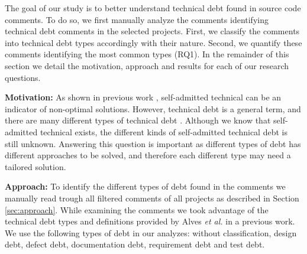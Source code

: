The goal of our study is to better understand technical debt found in source code comments. To do so, we first manually analyze the comments identifying technical debt comments in the selected projects. First, we classify the comments into technical debt types accordingly with their nature. Second, we quantify these comments identifying the most common types (RQ1). In the remainder of this section we detail the motivation, approach and results for each of our research questions.  

\vspace{3mm}
\noindent\rqi
\vspace{3mm}


\noindent\textbf{Motivation:} As shown in previous work \cite{Potdar2014ICSME}, self-admitted technical can be an indicator of non-optimal solutions. However, technical debt is a general term, and there are many different types of technical debt \cite{Alves2014MTD}. Although we know that self-admitted technical exists, the different kinds of self-admitted technical debt is still  unknown. Answering this question is important as different types of debt has different approaches to be solved, and therefore each different type may need a tailored solution.


\vspace{1mm}
\noindent\textbf{Approach:} To identify the different types of debt found in the comments we manually read trough all filtered comments of all projects as described in Section \ref{sec:approach}. While examining the comments we took advantage of the technical debt types and definitions provided by Alves \textit{et al.} in a previous work. We use the following types of debt in our analyzes: without classification, design debt, defect debt, documentation debt, requirement debt and  test debt.

